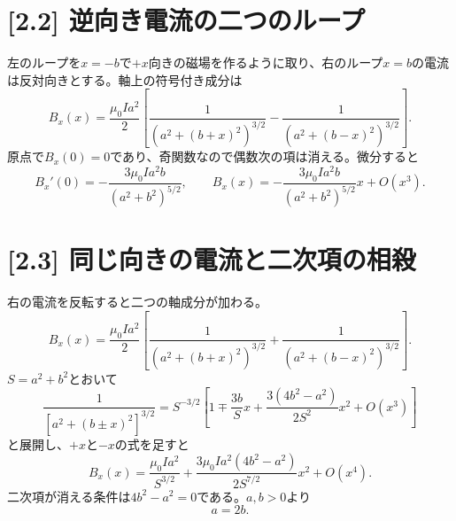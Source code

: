 \documentclass[11pt,a4paper]{article}
\begin{document}
\section*{[2.2] 逆向き電流の二つのループ}
左のループを$x=-b$で$+x$向きの磁場を作るように取り、右のループ$x=b$の電流は反対向きとする。軸上の符号付き成分は
\begin{equation}
 B_x(x)=\frac{\mu_0Ia^2}{2}\left[
 \frac{1}{(a^2+(b+x)^2)^{3/2}}-
 \frac{1}{(a^2+(b-x)^2)^{3/2}}\right].
\end{equation}
原点で$B_x(0)=0$であり、奇関数なので偶数次の項は消える。微分すると
\begin{equation}
 B_x'(0)=-\frac{3\mu_0Ia^2b}{(a^2+b^2)^{5/2}},\qquad
 \boxed{B_x(x)=-\frac{3\mu_0Ia^2b}{(a^2+b^2)^{5/2}}x+O(x^3)}.
\end{equation}

\section*{[2.3] 同じ向きの電流と二次項の相殺}
右の電流を反転すると二つの軸成分が加わる。
\begin{equation}
 B_x(x)=\frac{\mu_0Ia^2}{2}\left[
 \frac{1}{(a^2+(b+x)^2)^{3/2}}+
 \frac{1}{(a^2+(b-x)^2)^{3/2}}\right].
\end{equation}
$S=a^2+b^2$とおいて
\begin{equation}
 \frac{1}{[a^2+(b\pm x)^2]^{3/2}}
 =S^{-3/2}\left[1\mp\frac{3b}{S}x
 +\frac{3(4b^2-a^2)}{2S^2}x^2+O(x^3)\right]
\end{equation}
と展開し、$+x$と$-x$の式を足すと
\begin{equation}
 B_x(x)=\frac{\mu_0Ia^2}{S^{3/2}}
 +\frac{3\mu_0Ia^2(4b^2-a^2)}{2S^{7/2}}x^2+O(x^4).
\end{equation}
二次項が消える条件は$4b^2-a^2=0$である。$a,b>0$より
\begin{equation}
 \boxed{a=2b}.
\end{equation}
\end{document}
